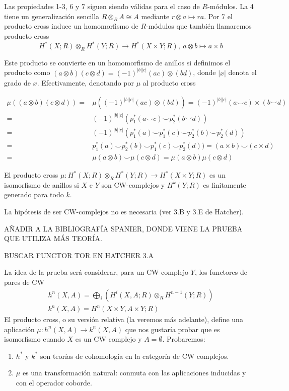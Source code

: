 \documentclass[TA.tex]{subfiles}
\begin{document}
Las propiedades 1-3, 6 y 7 siguen siendo válidas para el caso de $R$-módulos. La 4 tiene un generalización sencilla $R\otimes_R A\cong A$ mediante $r\otimes a\mapsto ra$. Por 7 el producto cross induce un homomorfismo de $R$-módulos que también llamaremos producto cross
\[
H^*(X;R)\otimes_R H^*(Y;R)\to H^*(X\times Y;R),\ a\otimes b\mapsto a\times b
\]


Este producto se convierte en un homomorfismo de anillos si definimos el producto como $(a\otimes b)(c\otimes d)=(-1)^{|b||c|}(ac)\otimes (bd)$, donde $|x|$ denota el grado de $x$. Efectivamente, denotando por $\mu$ al producto cross

\begin{align*}
\mu((a\otimes b)(c\otimes d))=&\mu((-1)^{|b||c|}(ac)\otimes (bd))=(-1)^{|b||c|}(a\smile c)\times (b\smile d)\\
=&(-1)^{|b||c|}(p_1^*(a\smile c)\smile p_2^*(b\smile d))\\
=&(-1)^{|b||c|}(p_1^*(a)\smile p_1^*(c)\smile p_2^*(b)\smile p_2^*(d))\\
=&p_1^*(a)\smile p_2^*(b)\smile p_1^*(c)\smile p_2^*(d))=(a\times b)\smile (c\times d)\\
=&\mu(a\otimes b)\smile \mu (c\otimes d)=\mu(a\otimes b)\mu(c\otimes d)
\end{align*}

\begin{teorema}\label{tensor}
El producto cross $\mu:H^*(X;R)\otimes_R H^*(Y;R)\to H^*(X\times Y;R)$ es un isomorfismo de anillos si $X$ e $Y$ son CW-complejos y $H^k(Y;R)$ es finitamente generado para todo $k$.
\end{teorema}

\begin{nota}
La hipótesis de ser CW-complejos no es necesaria (ver 3.B y 3.E de Hatcher).
\end{nota}


AÑADIR A LA BIBLIOGRAFÍA SPANIER, DONDE VIENE LA PRUEBA QUE UTILIZA MÁS TEORÍA.

BUSCAR FUNCTOR TOR EN HATCHER 3.A

La idea de la prueba será considerar, para un CW complejo $Y$, los functores de pares de CW
\begin{gather*}
h^n(X,A)=\bigoplus_i(H^i(X,A;R)\otimes_R H^{n-1}(Y;R))\\
k^n(X,A)=H^n(X\times Y,A\times Y;R)
\end{gather*}
El producto cross, o su versión relativa (la veremos más adelante), define una aplicación $\mu: h^n(X,A)\to k^n(X,A)$ que nos gustaría probar que es isomorfismo cuando $X$ es un CW complejo y $A=\emptyset$. Probaremos:
\begin{enumerate}
\item $h^*$ y $k^*$ son teorías de cohomología en la categoría de CW complejos.
\item $\mu$ es una transformación natural: conmuta con las aplicaciones inducidas y con el operador coborde. 
\end{enumerate}
\end{document}
